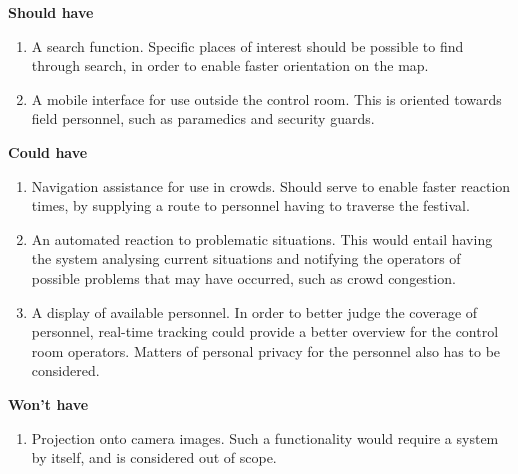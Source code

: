 \textbf{Should have}
\begin{enumerate}[resume]
    \item A search function. Specific places of interest should be possible to find through search, in order to enable faster orientation on the map.
    \item A mobile interface for use outside the control room. This is oriented towards field personnel, such as paramedics and security guards.
\end{enumerate}

\textbf{Could have}
\begin{enumerate}[resume]
    \item Navigation assistance for use in crowds. Should serve to enable faster reaction times, by supplying a route to personnel having to traverse the festival.
    \item An automated reaction to problematic situations. This would entail having the system analysing current situations and notifying the operators of possible problems that may have occurred, such as crowd congestion.
    \item A display of available personnel. In order to better judge the coverage of personnel, real-time tracking could provide a better overview for the control room operators. Matters of personal privacy for the personnel also has to be considered.
\end{enumerate}

\textbf{Won't have}
\begin{enumerate}[resume]
    \item Projection onto camera images. Such a functionality would require a system by itself, and is considered out of scope.
\end{enumerate}
\fi

